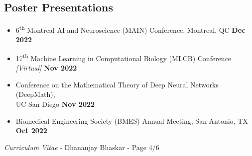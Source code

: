 \documentclass[margin,line]{res}
\begin{document}
\begin{resume}
\section{\sc Poster Presentations}
{\renewcommand\leftmargini{0em}
\begin{itemize}
\setlength\itemsep{0.3em}
\item[] 6\textsuperscript{th} Montreal AI and Neuroscience (MAIN) Conference, Montreal, QC \hfill {\bf Dec 2022}
\item[] 17\textsuperscript{th} Machine Learning in Computational Biology (MLCB) Conference \textit{[Virtual]} \hfill {\bf Nov 2022}
\item[] Conference on the Mathematical Theory of Deep Neural Networks (DeepMath), \\ UC San Diego \hfill {\bf Nov 2022}
\item[] Biomedical Engineering Society (BMES) Annual Meeting, San Antonio, TX \hfill {\bf Oct 2022}
\end{itemize}
}

\newpage
\begin{flushright}
\textit{Curriculum Vitae} - Dhananjay Bhaskar - Page 4/6
\end{flushright}
\vspace*{.02cm}


\end{resume}
\end{document}
